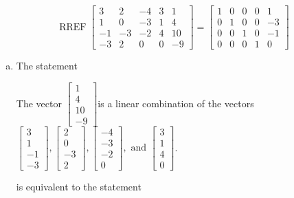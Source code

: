 \begin{exerciseAnswer} 
\[\operatorname{RREF}  \left[\begin{array}{cccc|c}
3 & 2 & -4 & 3 & 1 \\
1 & 0 & -3 & 1 & 4 \\
-1 & -3 & -2 & 4 & 10 \\
-3 & 2 & 0 & 0 & -9
\end{array}\right] = \left[\begin{array}{cccc|c}
1 & 0 & 0 & 0 & 1 \\
0 & 1 & 0 & 0 & -3 \\
0 & 0 & 1 & 0 & -1 \\
0 & 0 & 0 & 1 & 0
\end{array}\right] \]
\begin{enumerate}[(a)]
\item  The statement 
\begin{center}\begin{minipage}{0.8\textwidth}
 The vector \( \left[\begin{array}{c}
1 \\
4 \\
10 \\
-9
\end{array}\right] \)is a linear combination of the vectors \( \left[\begin{array}{c}
3 \\
1 \\
-1 \\
-3
\end{array}\right] , \left[\begin{array}{c}
2 \\
0 \\
-3 \\
2
\end{array}\right] , \left[\begin{array}{c}
-4 \\
-3 \\
-2 \\
0
\end{array}\right] , \text{ and } \left[\begin{array}{c}
3 \\
1 \\
4 \\
0
\end{array}\right] \). 
\end{minipage}\end{center}
     is equivalent to the statement 
\begin{center}\begin{minipage}{0.8\textwidth}

\end{minipage}
\end{center}
\end{enumerate}
\end{exerciseAnswer}
